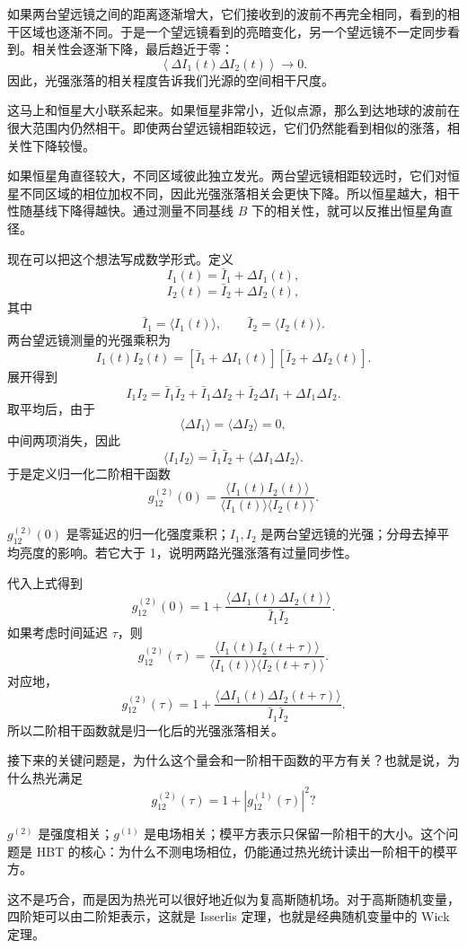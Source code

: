 如果两台望远镜之间的距离逐渐增大，它们接收到的波前不再完全相同，看到的相干区域也逐渐不同。于是一个望远镜看到的亮暗变化，另一个望远镜不一定同步看到。相关性会逐渐下降，最后趋近于零：
\[
  \left\langle \Delta I_1(t)\Delta I_2(t)\right\rangle\rightarrow 0.
\]
因此，光强涨落的相关程度告诉我们光源的空间相干尺度。

这马上和恒星大小联系起来。如果恒星非常小，近似点源，那么到达地球的波前在很大范围内仍然相干。即使两台望远镜相距较远，它们仍然能看到相似的涨落，相关性下降较慢。

如果恒星角直径较大，不同区域彼此独立发光。两台望远镜相距较远时，它们对恒星不同区域的相位加权不同，因此光强涨落相关会更快下降。所以恒星越大，相干性随基线下降得越快。通过测量不同基线 \(B\) 下的相关性，就可以反推出恒星角直径。

现在可以把这个想法写成数学形式。定义
\[
  I_1(t)=\bar I_1+\Delta I_1(t),
\]
\[
  I_2(t)=\bar I_2+\Delta I_2(t),
\]
其中
\[
  \bar I_1=\langle I_1(t)\rangle,\qquad
  \bar I_2=\langle I_2(t)\rangle.
\]
两台望远镜测量的光强乘积为
\[
  I_1(t)I_2(t)
  =
  [\bar I_1+\Delta I_1(t)]
  [\bar I_2+\Delta I_2(t)].
\]
展开得到
\[
  I_1I_2
  =
  \bar I_1\bar I_2
  +
  \bar I_1\Delta I_2
  +
  \bar I_2\Delta I_1
  +
  \Delta I_1\Delta I_2.
\]
取平均后，由于
\[
  \langle \Delta I_1\rangle=
  \langle \Delta I_2\rangle=0,
\]
中间两项消失，因此
\[
  \langle I_1I_2\rangle
  =
  \bar I_1\bar I_2+
  \langle \Delta I_1\Delta I_2\rangle.
\]
于是定义归一化二阶相干函数
\[
  g^{(2)}_{12}(0)
  =
  \frac{
    \langle I_1(t)I_2(t)\rangle
  }{
    \langle I_1(t)\rangle
    \langle I_2(t)\rangle
  }.
\]
\begin{formulaexplain}[二阶相干解读]
\(g^{(2)}_{12}(0)\) 是零延迟的归一化强度乘积；\(I_1,I_2\) 是两台望远镜的光强；分母去掉平均亮度的影响。若它大于 1，说明两路光强涨落有过量同步性。
\end{formulaexplain}
代入上式得到
\[
  g^{(2)}_{12}(0)
  =
  1+
  \frac{
    \langle \Delta I_1(t)\Delta I_2(t)\rangle
  }{
    \bar I_1\bar I_2
  }.
\]
如果考虑时间延迟 \(\tau\)，则
\[
  g^{(2)}_{12}(\tau)
  =
  \frac{
    \langle I_1(t)I_2(t+\tau)\rangle
  }{
    \langle I_1(t)\rangle
    \langle I_2(t+\tau)\rangle
  }.
\]
对应地，
\[
  g^{(2)}_{12}(\tau)
  =
  1+
  \frac{
    \langle \Delta I_1(t)\Delta I_2(t+\tau)\rangle
  }{
    \bar I_1\bar I_2
  }.
\]
所以二阶相干函数就是归一化后的光强涨落相关。

接下来的关键问题是，为什么这个量会和一阶相干函数的平方有关？也就是说，为什么热光满足
\[
  g^{(2)}_{12}(\tau)=1+\left|g^{(1)}_{12}(\tau)\right|^2?
\]
\begin{formulaexplain}
\(g^{(2)}\) 是强度相关；\(g^{(1)}\) 是电场相关；模平方表示只保留一阶相干的大小。这个问题是 HBT 的核心：为什么不测电场相位，仍能通过热光统计读出一阶相干的模平方。
\end{formulaexplain}
这不是巧合，而是因为热光可以很好地近似为复高斯随机场。对于高斯随机变量，四阶矩可以由二阶矩表示，这就是 Isserlis 定理，也就是经典随机变量中的 Wick 定理。

